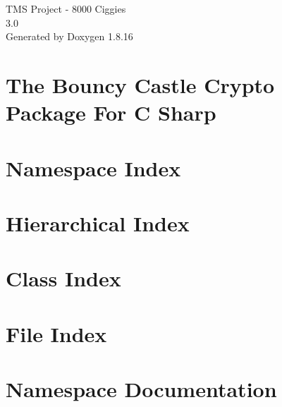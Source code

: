 \let\mypdfximage\pdfximage\def\pdfximage{\immediate\mypdfximage}\documentclass[twoside]{book}
\newcommand{\+}{\discretionary{\mbox{\scriptsize$\hookleftarrow$}}{}{}}
\newcommand{\clearemptydoublepage}{%
  \newpage{\pagestyle{empty}\cleardoublepage}%
}
\begin{document}
\hypersetup{pageanchor=false,
             bookmarksnumbered=true,
             pdfencoding=unicode
            }
\begin{titlepage}
\vspace*{7cm}
\begin{center}%
{\Large T\+MS Project -\/ 8000 Ciggies \\[1ex]\large 3.\+0 }\\
\vspace*{1cm}
{\large Generated by Doxygen 1.8.16}\\
\end{center}
\end{titlepage}
\clearemptydoublepage
{}
\tableofcontents
\clearemptydoublepage
{}
\hypersetup{pageanchor=true}

\chapter{The Bouncy Castle Crypto Package For C Sharp}
\label{md__c_1__users__school__user__code__t_m_s-_dump__transport__management__system__w_p_f_packages__bb4bf1c016a2490d0cd8a96342590661}

\chapter{Namespace Index}

\chapter{Hierarchical Index}

\chapter{Class Index}

\chapter{File Index}

\chapter{Namespace Documentation}






\end{document}
